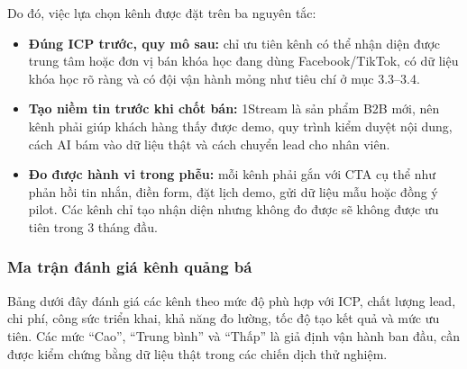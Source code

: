 Do đó, việc lựa chọn kênh được đặt trên ba nguyên tắc:
\begin{itemize}
    \item \textbf{Đúng ICP trước, quy mô sau:} chỉ ưu tiên kênh có thể nhận diện
    được trung tâm hoặc đơn vị bán khóa học đang dùng Facebook/TikTok, có dữ liệu
    khóa học rõ ràng và có đội vận hành mỏng như tiêu chí ở mục 3.3--3.4.
    \item \textbf{Tạo niềm tin trước khi chốt bán:} 1Stream là sản phẩm B2B mới,
    nên kênh phải giúp khách hàng thấy được demo, quy trình kiểm duyệt nội dung,
    cách AI bám vào dữ liệu thật và cách chuyển lead cho nhân viên.
    \item \textbf{Đo được hành vi trong phễu:} mỗi kênh phải gắn với CTA cụ thể
    như phản hồi tin nhắn, điền form, đặt lịch demo, gửi dữ liệu mẫu hoặc đồng ý
    pilot. Các kênh chỉ tạo nhận diện nhưng không đo được sẽ không được ưu tiên
    trong 3 tháng đầu.
\end{itemize}

\subsubsection{Ma trận đánh giá kênh quảng bá}

Bảng dưới đây đánh giá các kênh theo mức độ phù hợp với ICP, chất lượng lead,
chi phí, công sức triển khai, khả năng đo lường, tốc độ tạo kết quả và mức ưu
tiên. Các mức ``Cao'', ``Trung bình'' và ``Thấp'' là giả định vận hành ban đầu,
cần được kiểm chứng bằng dữ liệu thật trong các chiến dịch thử nghiệm.

